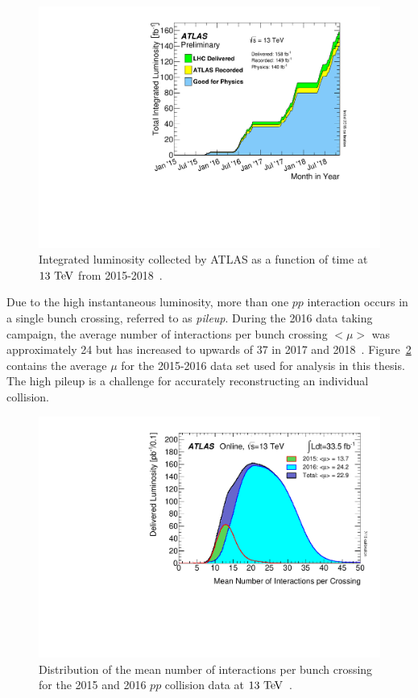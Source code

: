 \begin{figure}
  \centering
  \includegraphics[width=.6\textwidth]{figs/detector/intLumiVsTimeRun2}
  \caption[Integrated luminosity collected by ATLAS as a function of time at $13\tev$ from 2015-2018.]{Integrated luminosity collected by ATLAS as a function of time at $13\tev$ from 2015-2018~\cite{2019.atlas-lumi-plots}.}
  \label{fig:atlas_integrated_lumi}
\end{figure}

Due to the high instantaneous luminosity, more than one $pp$ interaction occurs in a single bunch crossing, referred to as \emph{pileup}.
During the 2016 data taking campaign, the average number of interactions per bunch crossing $<\mu >$ was approximately 24 but has increased to upwards of 37 in 2017 and 2018~\cite{2019.atlas-lumi-plots}.
Figure~\ref{fig:detector_pileup} contains the average $\mu$ for the 2015-2016 data set used for analysis in this thesis.
The high pileup is a challenge for accurately reconstructing an individual collision.

\begin{figure}
  \centering
  \includegraphics[width=.6\textwidth]{figs/detector/meanInteractionsPerCrossing}
  \caption[Distribution of the mean number of interactions per bunch crossing for the 2015 and 2016 $pp$ collision data at $13\tev$.]{Distribution of the mean number of interactions per bunch crossing for the 2015 and 2016 $pp$ collision data at $13\tev$~\cite{2019.atlas-lumi-plots}.}
  \label{fig:detector_pileup}
\end{figure}
